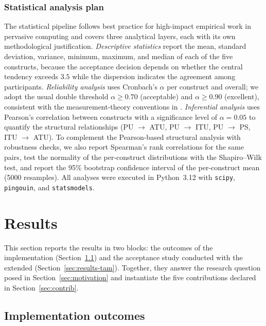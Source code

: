 \documentclass[a4paper,fleqn]{cas-sc}
\begin{document}
	\subsubsection{Statistical analysis plan}\label{sec:stats}
	
	The statistical pipeline follows best practice for high-impact empirical work in pervasive computing and covers three analytical layers, each with its own methodological justification. \emph{Descriptive statistics} report the mean, standard deviation, variance, minimum, maximum, and median of each of the five constructs, because the acceptance decision depends on whether the central tendency exceeds $3.5$ \citep{lindner2024likert} while the dispersion indicates the agreement among participants. \emph{Reliability analysis} uses Cronbach's $\alpha$ per construct and overall; we adopt the usual double threshold $\alpha\geq 0.70$ (acceptable) and $\alpha\geq 0.90$ (excellent), consistent with the measurement-theory conventions in \citep{davis1989tam}. \emph{Inferential analysis} uses Pearson's correlation between constructs with a significance level of $\alpha=0.05$ to quantify the \TAM{} structural relationships (PU $\to$ ATU, PU $\to$ ITU, PU $\to$ PS, ITU $\to$ ATU). To complement the Pearson-based structural analysis with robustness checks, we also report Spearman's rank correlations for the same pairs, test the normality of the per-construct distributions with the Shapiro--Wilk test, and report the 95\% bootstrap confidence interval of the per-construct mean (5000 resamples). All analyses were executed in Python~3.12 with \texttt{scipy}, \texttt{pingouin}, and \texttt{statsmodels}.
	
	\section{Results}\label{sec:results}
	
	This section reports the results in two blocks: the outcomes of the implementation (Section~\ref{sec:results-impl}) and the acceptance study conducted with the extended \TAM{} (Section~\ref{sec:results-tam}). Together, they answer the research question posed in Section~\ref{sec:motivation} and instantiate the five contributions declared in Section~\ref{sec:contrib}.
	
	\subsection{Implementation outcomes}\label{sec:results-impl}
	
\end{document}
